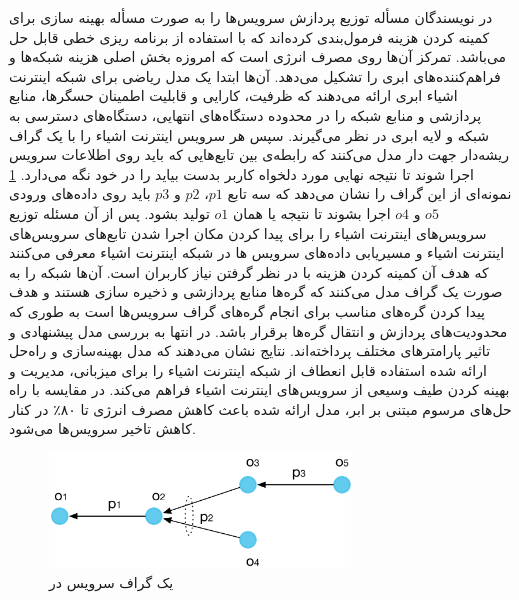     در \cite{barcelo2016iot} نویسندگان مسأله توزیع پردازش سرویس‌ها‌ را به صورت مسأله بهینه سازی برای کمینه کردن هزینه فرمول‌بندی کرده‌اند که با استفاده از برنامه ریزی خطی قابل حل می‌باشد.
    تمرکز آن‌ها روی مصرف انرژی است که امروزه بخش اصلی هزینه شبکه‌ها و فراهم‌کننده‌های ابری را تشکیل می‌دهد.
    آن‌ها ابتدا یک مدل ریاضی برای شبکه اینترنت اشیاء ابری ارائه می‌دهند که ظرفیت، کارایی و قابلیت اطمینان حسگر‌ها، منابع پردازشی و منابع شبکه را در محدوده دستگاه‌های انتهایی، دستگاه‌های دسترسی به شبکه و لایه ابری در نظر می‌گیرند.
    سپس هر سرویس اینترنت اشیاء را با یک گراف ریشه‌دار جهت دار مدل می‌کنند که رابطه‌ی بین تابع‌هایی که باید روی اطلاعات سرویس اجرا شوند تا نتیجه نهایی مورد دلخواه کاربر بدست بیاید را در خود نگه می‌دارد.
    \cref{fig:chapter_2:service_graph_barcelo2016iot} نمونه‌ای از این گراف را نشان می‌دهد که سه تابع $p1$، $p2$ و $p3$ باید روی داده‌های ورودی $o5$ و $o4$ اجرا بشوند تا نتیجه یا همان $o1$ تولید بشود.
    پس از آن مسئله توزیع سرویس‌های اینترنت اشیاء را برای پیدا کردن مکان اجرا شدن تابع‌های سرویس‌های اینترنت اشیاء و مسیریابی داده‌های سرویس ها در شبکه اینترنت اشیاء معرفی می‌کنند که هدف آن کمینه کردن هزینه با در نظر گرفتن نیاز کاربران است.
    آن‌ها شبکه را به صورت یک گراف مدل می‌کنند که گره‌ها منابع پردازشی و ذخیره سازی هستند و هدف پیدا کردن گره‌های مناسب برای انجام گره‌های گراف‌ سرویس‌ها است به طوری که محدودیت‌های پردازش و انتقال گره‌ها برقرار باشد.
    در انتها به بررسی مدل پیشنهادی و تاثیر پارامتر‌های مختلف پرداخته‌اند. 
    نتایج نشان می‌دهند که مدل بهینه‌سازی و راه‌حل ارائه شده استفاده قابل انعطاف از شبکه اینترنت اشیاء را برای میزبانی، مدیریت و بهینه کردن طیف وسیعی از سرویس‌های اینترنت اشیاء فراهم می‌کند.
    در مقایسه با راه حل‌های مرسوم مبتنی بر ابر، مدل ارائه شده باعث کاهش مصرف انرژی تا ۸۰٪ در کنار کاهش تاخیر سرویس‌ها می‌شود.

    \begin{figure}[h]
      \centerline{\includegraphics[width=8cm]{graphics/chapter_2/service_graph_barcelo2016iot}}
      \caption{یک گراف سرویس در \cite{barcelo2016iot}}
      \label{fig:chapter_2:service_graph_barcelo2016iot}
    \end{figure}

